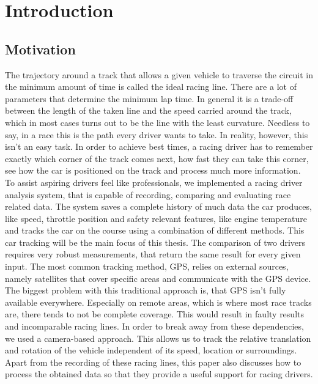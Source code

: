 \section{Introduction}
\label{sec:intro}

\subsection{Motivation}
The trajectory around a track that allows a given vehicle to traverse the circuit in the minimum amount of time is called the ideal racing line. There are a lot of parameters that determine the minimum lap time. In general it is a trade-off between the length of the taken line and the speed carried around the track, which in most cases turns out to be the line with the least curvature.  
Needless to say, in a race this is the path every driver wants to take. In reality, however, this isn't an easy task. In order to achieve best times, a racing driver has to remember exactly which corner of the track comes next, how fast they can take this corner, see how the car is positioned on the track and process much more information.
To assist aspiring drivers feel like professionals, we implemented a racing driver analysis system, that is capable of recording, comparing and evaluating race related data. The system saves a complete history of much data the car produces, like speed, throttle position and safety relevant features, like engine temperature and tracks the car on the course using a combination of different methods.
This car tracking will be the main focus of this thesis. The comparison of two drivers requires very robust measurements, that return the same result for every given input.
The most common tracking method, GPS, relies on external sources, namely satellites that cover specific areas and communicate with the GPS device. The biggest problem with this traditional approach is, that GPS isn't fully available everywhere. Especially on remote areas, which is where most race tracks are, there tends to not be complete coverage. This would result in faulty results and incomparable racing lines.
In order to break away from these dependencies, we used a camera-based approach. This allows us to track the relative translation and rotation of the vehicle independent of its speed, location or surroundings.
Apart from the recording of these racing lines, this paper also discusses how to process the obtained data so that they provide a useful support for racing drivers.

